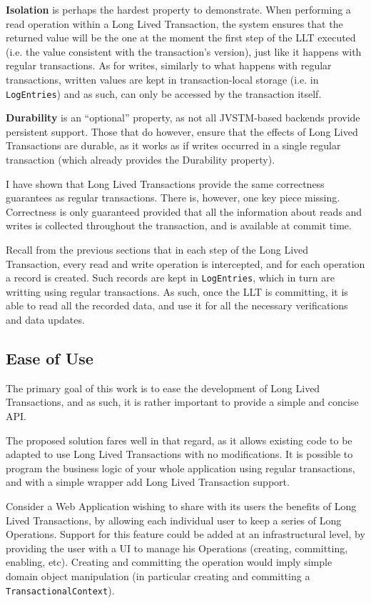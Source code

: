 {\bf Isolation} is perhaps the hardest property to demonstrate. When
performing a read operation within a Long Lived Transaction, the
system ensures that the returned value will be the one at the moment
the first step of the LLT executed (i.e. the value consistent with the
transaction's version), just like it happens with regular
transactions.  As for writes, similarly to what happens with regular
transactions, written values are kept in transaction-local storage
(i.e. in \texttt{LogEntries}) and as such, can only be accessed by the
transaction itself.

{\bf Durability} is an ``optional'' property, as not all JVSTM-based
backends provide persistent support. Those that do however, ensure
that the effects of Long Lived Transactions are durable, as it works as
if writes occurred in a single regular transaction (which already
provides the Durability property).

I have shown that Long Lived Transactions provide the same correctness
guarantees as regular transactions. There is, however, one key piece
missing. Correctness is only guaranteed provided that all the
information about reads and writes is collected throughout the
transaction, and is available at commit time.

Recall from the previous sections that in each step of the Long Lived
Transaction, every read and write operation is intercepted, and for
each operation a record is created. Such records are kept in
\texttt{LogEntries}, which in turn are writting using regular
transactions. As such, once the LLT is committing, it is able to read
all the recorded data, and use it for all the necessary verifications
and data updates.

\newpage

\subsection{Ease of Use}

The primary goal of this work is to ease the development of Long Lived
Transactions, and as such, it is rather important to provide a simple
and concise API.

The proposed solution fares well in that regard, as it allows existing
code to be adapted to use Long Lived Transactions with no
modifications. It is possible to program the business logic of your
whole application using regular transactions, and with a simple
wrapper add Long Lived Transaction support.

Consider a Web Application wishing to share with its users the
benefits of Long Lived Transactions, by allowing each individual user
to keep a series of Long Operations. Support for this feature could be
added at an infrastructural level, by providing the user with a UI to
manage his Operations (creating, committing, enabling, etc). Creating
and committing the operation would imply simple domain object
manipulation (in particular creating and committing a
\texttt{TransactionalContext}).

